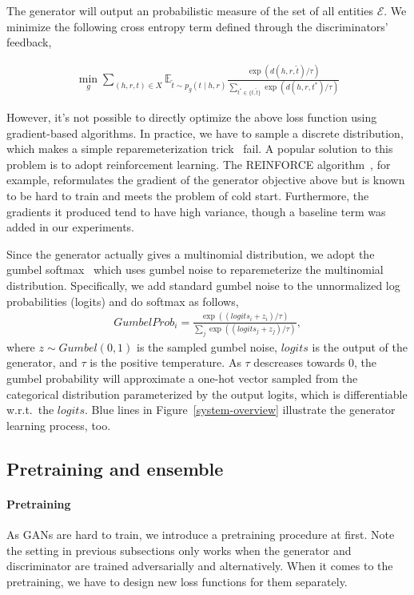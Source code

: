 \documentclass[twocolumn,a4paper,10pt,preprint,3p]{elsarticle}
\begin{document}
The generator will output an probabilistic measure of the set of all entities $\mathcal{E}$. We minimize the following cross entropy term defined through the discriminators' feedback,

\begin{align}
    \min_g \sum_{(h, r, t)\in X}
        \mathbb{E}_{\tilde t \sim p_g(t \mid h, r)}
            \frac{\exp(d(h, r, \tilde t) / \tau)}
                 {\sum_{t^* \in \{ t, \tilde t\}} \exp(d(h, r, t^*) / \tau)} \label{eq:g_loss}
\end{align}

However, it's not possible to directly optimize the above loss function using gradient-based algorithms. In practice, we have to sample a discrete distribution, which makes a simple reparemeterization trick~\cite{VAE} fail. A popular solution to this problem is to adopt reinforcement learning. The REINFORCE algorithm~\cite{Williams_1992}, for example, reformulates the gradient of the generator objective above but is known to be hard to train and meets the problem of cold start. Furthermore, the gradients it produced tend to have high variance, though a baseline term was added in our experiments.

Since the generator actually gives a multinomial distribution, we adopt the gumbel softmax~\cite{GumbelSoftmax_Jiang_2016} which uses gumbel noise to reparemeterize the multinomial distribution. Specifically, we add standard gumbel noise to the unnormalized log probabilities (logits) and do softmax as follows,
\begin{align*}
    GumbelProb_i = \frac{\exp((logits_i + z_i)/ \tau)}{\sum_{j}\exp((logits_j + z_j)/ \tau)},
\end{align*}
where $z \sim Gumbel(0, 1)$ is the sampled gumbel noise, $logits$ is the output of the generator, and $\tau$ is the positive temperature. As $\tau$ descreases towards 0, the gumbel probability will approximate a one-hot vector sampled from the categorical distribution parameterized by the output logits, which is differentiable w.r.t.\ the $logits$. Blue lines in Figure~\ref{system-overview} illustrate the generator learning process, too.


\subsection{Pretraining and ensemble}

\paragraph{Pretraining} As GANs are hard to train, we introduce a pretraining procedure at first. Note the setting in previous subsections only works when the generator and discriminator are trained adversarially and alternatively. When it comes to the pretraining, we have to design new loss functions for them separately.
\end{document}
